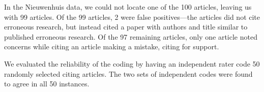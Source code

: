 \documentclass[12pt, letterpaper]{article}
\begin{document}
In the Nieuwenhuis data, we could not locate one of the 100 articles, leaving us with 99 articles. Of the 99 articles, 2 were false positives---the articles did not cite erroneous research, but instead cited a paper with authors and title similar to published erroneous research. Of the 97 remaining articles, only one article noted concerns while citing an article making a mistake, citing \citet{nieuwenhuis2011} for support. 

We evaluated the reliability of the coding by having an independent rater code 50 randomly selected citing articles. The two sets of independent codes were found to agree in all 50 instances.
\end{document}
